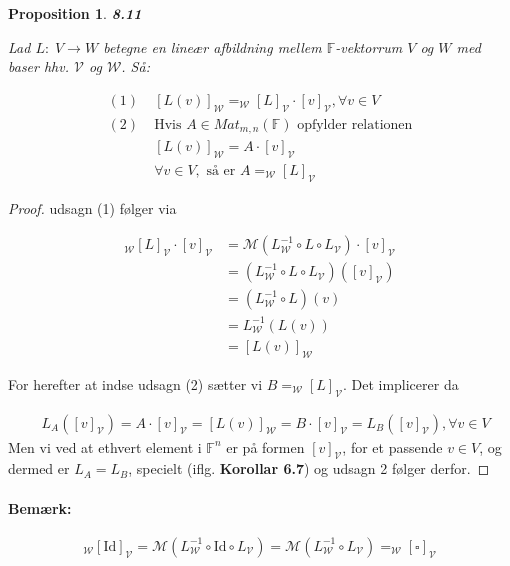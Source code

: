 \documentclass[paper=a4, fontsize=11pt]{scrartcl} %
\newtheorem*{proposition}{Proposition}
\newenvironment{cstmproposition}[1]{\begin{proposition} {\normalfont\textbf{#1}}}{\end{proposition}}
\begin{document}
	\begin{cstmproposition}{8.11}
		
		Lad $L: \; V \rightarrow W$ betegne en lineær afbildning mellem $\mathbb{F}$-vektorrum $V$ og $W$ med baser hhv. $\mathcal{V}$ og $\mathcal{W}$. Så:
		
		\begin{align*}
			(1) \; &[L(v)]_{\mathcal{W}} = _{\mathcal{W}}[L]_{\mathcal{V}} \cdot [v]_{\mathcal{V}}, \forall v \in V\\
			(2) \; &\mbox{Hvis } A \in Mat_{m,n}(\mathbb{F}) \mbox{ opfylder relationen}\\
			&[L(v)]_{\mathcal{W}} = A \cdot [v]_{\mathcal{V}}\\
			&\forall v \in V, \mbox{ så er } A = _{\mathcal{W}}[L]_{\mathcal{V}}
		\end{align*}
		
		
	\end{cstmproposition}
	
	\begin{proof}
		
		udsagn (1) følger via
		
		\begin{align*}
			_{\mathcal{W}}[L]_{\mathcal{V}} \cdot [v]_{\mathcal{V}} &= \mathcal{M}(L_{\mathcal{W}}^{-1} \circ L \circ L_{\mathcal{V}}) \cdot [v]_\mathcal{V}\\
			&=(L_{\mathcal{W}}^{-1} \circ L \circ L_{\mathcal{V}})([v]_{\mathcal{V}})\\
			&=(L_{\mathcal{W}}^{-1} \circ L)(v)\\
			&=L_{\mathcal{W}}^{-1}(L(v))\\
			&=[L(v)]_{\mathcal{W}}
		\end{align*}
		
		For herefter at indse udsagn (2) sætter vi $B = _{\mathcal{W}}[L]_{\mathcal{V}}$. Det implicerer da
		
		\begin{align*}
			&L_A([v]_{\mathcal{V}}) = A \cdot [v]_{\mathcal{V}} = [L(v)]_{\mathcal{W}} = B \cdot [v]_{\mathcal{V}} = L_B([v]_{\mathcal{V}}), \forall v \in V
		\end{align*}
		Men vi ved at ethvert element i $\mathbb{F}^n$ er på formen $[v]_{\mathcal{V}}$, for et passende $v \in V$, og dermed er $L_A = L_B$, specielt (iflg. \textbf{Korollar 6.7}) og udsagn 2 følger derfor.
		
		
	\end{proof}
	
	\paragraph{Bemærk:}
	\[_{\mathcal{W}}[\text{Id}]_{\mathcal{V}} = \mathcal{M}(L_{\mathcal{W}}^{-1} \circ \text{Id} \circ L_{\mathcal{V}}) = \mathcal{M}(L_{\mathcal{W}}^{-1} \circ L_{\mathcal{V}}) = _{\mathcal{W}}[{\scriptstyle\square}]_{\mathcal{V}}\]
	
\end{document}
